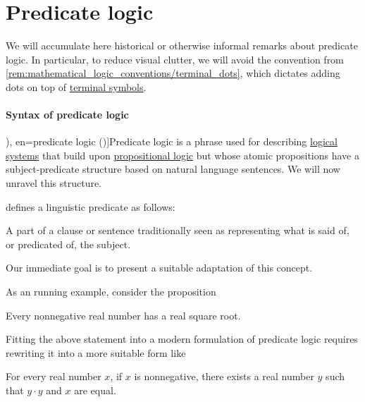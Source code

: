 \section{Predicate logic}\label{sec:predicate_logic}

We will accumulate here historical or otherwise informal remarks about predicate logic. In particular, to reduce visual clutter, we will avoid the convention from \cref{rem:mathematical_logic_conventions/terminal_dots}, which dictates adding dots on top of \hyperref[def:formal_grammar]{terminal symbols}.

\paragraph{Syntax of predicate logic}

\begin{concept}\label{con:predicate_logic}
  \term[ru=предикатная логика (\cite[49]{КолмогоровДрагалин2006ЛогикаВведение}), en=predicate logic (\cite[ch. 2]{VanDalen2004LogicAndStructure})]{Predicate logic} is a phrase used for describing \hyperref[con:logical_system]{logical systems} that build upon \hyperref[def:propositional_logic]{propositional logic} but whose atomic propositions have a subject-predicate structure based on natural language sentences. We will now unravel this structure.

  \begin{thmenum}
     \textcite{Matthews2007DictionaryOfLinguistics} defines a linguistic predicate as follows:
    \begin{displayquote}
      A part of a clause or sentence traditionally seen as representing what is said of, or predicated of, the subject.
    \end{displayquote}

    Our immediate goal is to present a suitable adaptation of this concept.

    As an running example, consider the proposition
    \begin{displayquote}
      Every nonnegative real number has a real square root.
    \end{displayquote}

    Fitting the above statement into a modern formulation of predicate logic requires rewriting it into a more suitable form like
    \begin{displayquote}
      For every real number \( x \), if \( x \) is nonnegative, there exists a real number \( y \) such that \( y \cdot y \) and \( x \) are equal.
    \end{displayquote}


\end{thmenum}
\end{concept}
